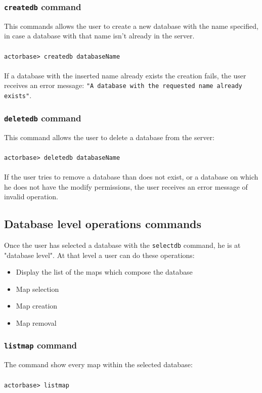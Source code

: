 \documentclass[a4paper]{article}
\begin{document}
	\subsubsection{\texttt{createdb} command}
	This commands allows the user to create a new database with the name specified, in case a database with that name isn't already in the server.
	\\ \\
	\texttt{actorbase>	createdb databaseName}
	\\ \\
	If a database with the inserted name already exists the creation fails, the user receives an error message: \texttt{"A database with the requested name already exists"}.

	\subsubsection{\texttt{deletedb} command}
	This command allows the user to delete a database from the server:
	\\ \\
	\texttt{actorbase>	deletedb databaseName}
	\\ \\
	If the user tries to remove a database than does not exist, or a database on which he does not have the modify permissions, the user receives an error message of invalid operation.
	

	\subsection{Database level operations commands}
	Once the user has selected a database with the \texttt{selectdb} command, he is at "database level". At that level a user can do these operations:
	\begin{itemize}
		\item Display the list of the maps which compose the database
		\item Map selection
		\item Map creation
		\item Map removal
	\end{itemize}

	\subsubsection{\texttt{listmap} command}
	The command show every map within the selected database:
	\\ \\
	\texttt{actorbase>	listmap}
\end{document}
